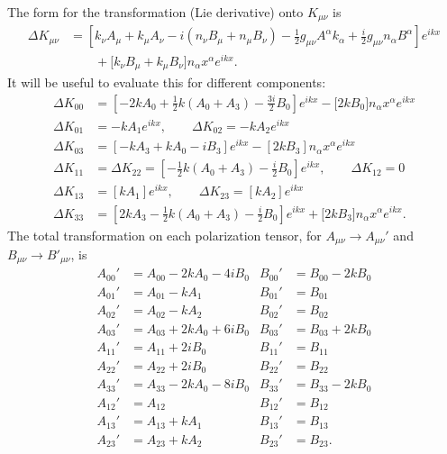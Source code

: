 \documentclass[10pt,letterpaper]{article}
\begin{document}
The form for the transformation (Lie derivative) onto $K_{\mu\nu}$ is
\begin{align}
\Delta K_{\mu\nu} &= \left[ k_\nu A_\mu + k_\mu A_\nu - i \left( n_\nu B_\mu + n_\mu B_\nu\right) 
-\frac12 g_{\mu\nu} A^\alpha k_\alpha + \frac{i}{2} g_{\mu\nu}n_\alpha B^\alpha \right]e^{ikx}
\nonumber\\
&\qquad + \bigg[ k_\nu B_\mu + k_\mu B_\nu \bigg] n_\alpha x^\alpha e^{ikx}.
\end{align}
It will be useful to evaluate this for different components:
\begin{align}
\Delta K_{00} &=\left[ -2 kA_0 +\frac12 k(A_0 + A_3) - \frac{3i}{2} B_0\right]e^{ikx} - \bigg[2kB_0\bigg] n_\alpha x^\alpha e^{ikx}
\nonumber\\
\Delta K_{01} &=  -k A_1 e^{ikx},\qquad \Delta K_{02} =  -k A_2 e^{ikx}
\nonumber\\
\Delta K_{03} &= \left[ -kA_3 +kA_0 -i B_3\right]e^{ikx} - \left[2kB_3\right] n_\alpha x^\alpha e^{ikx}
\nonumber\\
\Delta K_{11} &= \Delta K_{22} =  \left[ - \frac12 k(A_0 + A_3) - \frac{i}{2}B_0 \right]  e^{ikx},\qquad \Delta K_{12} = 0
\nonumber\\
\Delta K_{13} &= [kA_1]e^{ikx},\qquad \Delta K_{23} = [kA_2]e^{ikx}
\nonumber\\
\Delta K_{33} &= \left[ 2kA_3 -\frac12 k(A_0+A_3) - \frac{i}{2}B_0\right]e^{ikx} + \bigg[2kB_3\bigg]n_\alpha x^\alpha e^{ikx}.
\end{align}
The total transformation on each polarization tensor, for $A_{\mu\nu} \to A_{\mu\nu}'$ and $B_{\mu\nu} \to B'_{\mu\nu}$, is 
\begin{align}
A_{00}' &= A_{00} -2kA_0 - 4i B_0 			& B_{00}'&= B_{00} -2k B_0
\nonumber\\
A_{01}' &= A_{01} - kA_1							& B_{01}'&= B_{01} 
\nonumber\\
A_{02}' &= A_{02} - kA_2							&B_{02}'&= B_{02}
\nonumber\\
A_{03}' &= A_{03} +2kA_0 + 6i B_0			&B_{03}'&= B_{03} + 2kB_0
\nonumber \\
A_{11}' &= A_{11} + 2i B_0						&B_{11}'&= B_{11}
\nonumber\\
A_{22}' & = A_{22} +2iB_0						&B_{22}'&= B_{22}
\nonumber\\
A_{33}' &= A_{33}-2k A_0 - 8i B_0				&B_{33}'&= B_{33} - 2kB_0
\nonumber\\
A_{12}' &= A_{12}									&B_{12}'&=B_{12}
\nonumber\\
A_{13}' &= A_{13} + kA_1						&B_{13}'&=B_{13}
\nonumber\\
A_{23}' &= A_{23} + k A_2						&B_{23}'&=B_{23}.
\end{align}
\end{document}
